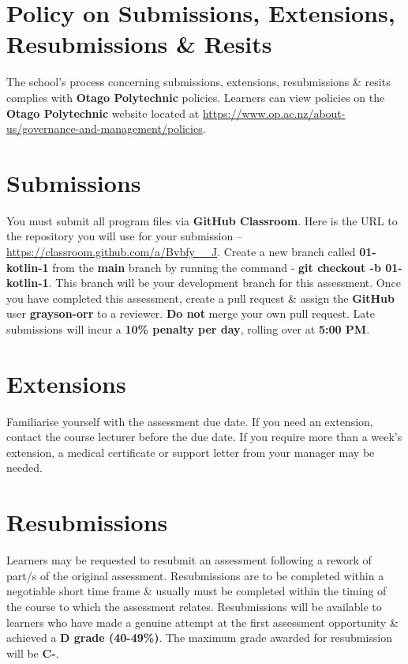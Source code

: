 \documentclass{article}
\begin{document}
\section*{Policy on Submissions, Extensions, Resubmissions \& Resits}
The school's process concerning submissions, extensions, resubmissions \& resits complies with \textbf{Otago Polytechnic} policies. Learners can view policies on the \textbf{Otago Polytechnic} website located at \href{https://www.op.ac.nz/about-us/governance-and-management/policies}{https://www.op.ac.nz/about-us/governance-and-management/policies}.

\section*{Submissions}
You must submit all program files via \textbf{GitHub Classroom}. Here is the URL to the repository you will use for your submission – \href{https://classroom.github.com/a/Bvbfy\_\_J}{https://classroom.github.com/a/Bvbfy\_\_J}. Create a new branch called  \textbf{01-kotlin-1} from the \textbf{main} branch by running the command - \textbf{git checkout -b 01-kotlin-1}. This branch will be your development branch for this assessment. Once you have completed this assessment, create a pull request \& assign the \textbf{GitHub} user \textbf{grayson-orr} to a reviewer. \textbf{Do not} merge your own pull request. Late submissions will incur a \textbf{10\% penalty per day}, rolling over at \textbf{5:00 PM}.

\section*{Extensions}
Familiarise yourself with the assessment due date. If you need an extension, contact the course lecturer before the due date. If you require more than a week's extension, a medical certificate or support letter from your manager may be needed.

\section*{Resubmissions}
Learners may be requested to resubmit an assessment following a rework of part/s of the original assessment. Resubmissions are to be completed within a negotiable short time frame \& usually must be completed within the timing of the course to which the assessment relates. Resubmissions will be available to learners who have made a genuine attempt at the first assessment opportunity \& achieved a \textbf{D grade (40-49\%)}. The maximum grade awarded for resubmission will be \textbf{C-}.
\end{document}
